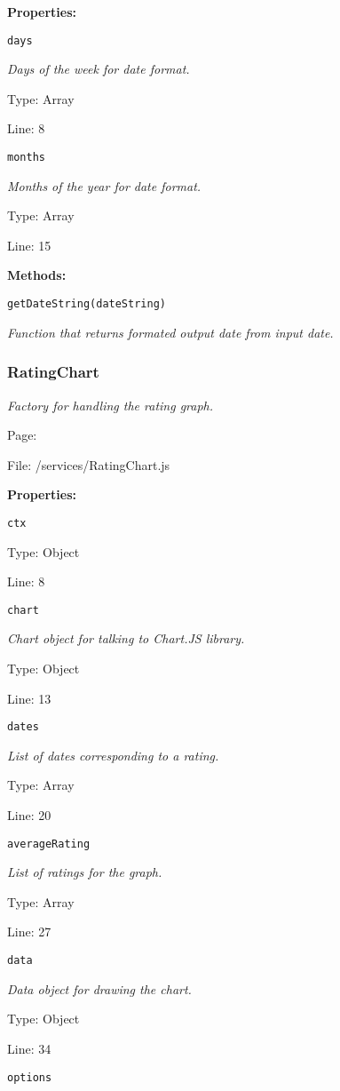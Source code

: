 \textbf{Properties:}

\texttt{days}

{\scriptsize
\textit{Days of the week for date format.}

Type: Array

Line: 8

}
\texttt{months}

{\scriptsize
\textit{Months of the year for date format.}

Type: Array

Line: 15

}
\textbf{Methods:}

\texttt{getDateString(dateString)}

{\scriptsize
\textit{Function that returns formated output date from input date.}

}

\subsubsection{RatingChart}\label{RatingChart.js.doc}
\textit{Factory for handling the rating graph.}

Page: \pageref{RatingChart.js}

File: /services/RatingChart.js

\textbf{Properties:}

\texttt{ctx}

{\scriptsize
\textit{}

Type: Object

Line: 8

}
\texttt{chart}

{\scriptsize
\textit{Chart object for talking to Chart.JS library.}

Type: Object

Line: 13

}
\texttt{dates}

{\scriptsize
\textit{List of dates corresponding to a rating.}

Type: Array

Line: 20

}
\texttt{averageRating}

{\scriptsize
\textit{List of ratings for the graph.}

Type: Array

Line: 27

}
\texttt{data}

{\scriptsize
\textit{Data object for drawing the chart.}

Type: Object

Line: 34

}
\texttt{options}

